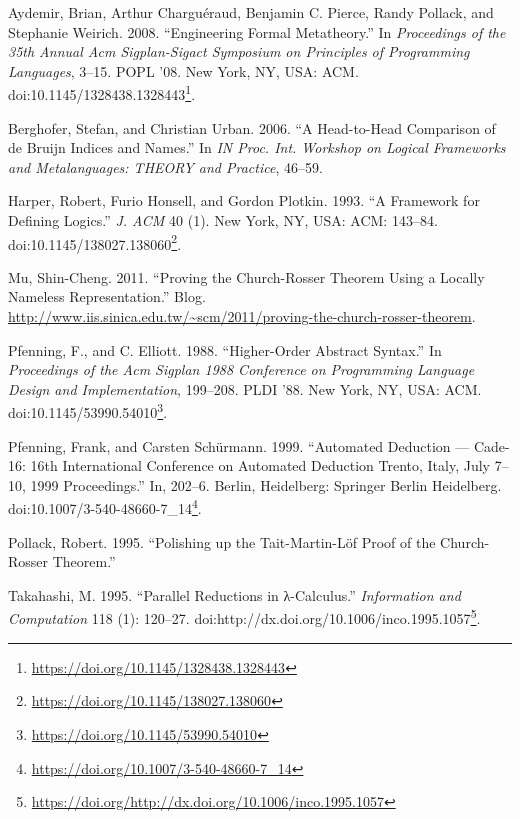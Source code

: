 \documentclass[a4paper, 12pt, twoside]{style/ociamthesis}
\renewcommand{\href}[2]{#2\footnote{\url{#1}}}
\begin{document}
\hypertarget{refs}{}
\hypertarget{ref-aydemir08}{}
Aydemir, Brian, Arthur Charguéraud, Benjamin C. Pierce, Randy Pollack,
and Stephanie Weirich. 2008. ``Engineering Formal Metatheory.'' In
\emph{Proceedings of the 35th Annual Acm Sigplan-Sigact Symposium on
Principles of Programming Languages}, 3--15. POPL '08. New York, NY,
USA: ACM.
doi:\href{https://doi.org/10.1145/1328438.1328443}{10.1145/1328438.1328443}.

\hypertarget{ref-berghofer06}{}
Berghofer, Stefan, and Christian Urban. 2006. ``A Head-to-Head
Comparison of de Bruijn Indices and Names.'' In \emph{IN Proc. Int.
Workshop on Logical Frameworks and Metalanguages: THEORY and Practice},
46--59.

\hypertarget{ref-harper93}{}
Harper, Robert, Furio Honsell, and Gordon Plotkin. 1993. ``A Framework
for Defining Logics.'' \emph{J. ACM} 40 (1). New York, NY, USA: ACM:
143--84.
doi:\href{https://doi.org/10.1145/138027.138060}{10.1145/138027.138060}.

\hypertarget{ref-shing-cheng}{}
Mu, Shin-Cheng. 2011. ``Proving the Church-Rosser Theorem Using a
Locally Nameless Representation.'' Blog.
\url{http://www.iis.sinica.edu.tw/~scm/2011/proving-the-church-rosser-theorem}.

\hypertarget{ref-pfenning88}{}
Pfenning, F., and C. Elliott. 1988. ``Higher-Order Abstract Syntax.'' In
\emph{Proceedings of the Acm Sigplan 1988 Conference on Programming
Language Design and Implementation}, 199--208. PLDI '88. New York, NY,
USA: ACM.
doi:\href{https://doi.org/10.1145/53990.54010}{10.1145/53990.54010}.

\hypertarget{ref-pfenning99}{}
Pfenning, Frank, and Carsten Schürmann. 1999. ``Automated Deduction ---
Cade-16: 16th International Conference on Automated Deduction Trento,
Italy, July 7--10, 1999 Proceedings.'' In, 202--6. Berlin, Heidelberg:
Springer Berlin Heidelberg.
doi:\href{https://doi.org/10.1007/3-540-48660-7_14}{10.1007/3-540-48660-7\_14}.

\hypertarget{ref-pollack95}{}
Pollack, Robert. 1995. ``Polishing up the Tait-Martin-Löf Proof of the
Church-Rosser Theorem.''

\hypertarget{ref-takahashi95}{}
Takahashi, M. 1995. ``Parallel Reductions in λ-Calculus.''
\emph{Information and Computation} 118 (1): 120--27.
doi:\href{https://doi.org/http://dx.doi.org/10.1006/inco.1995.1057}{http://dx.doi.org/10.1006/inco.1995.1057}.

\end{document}
